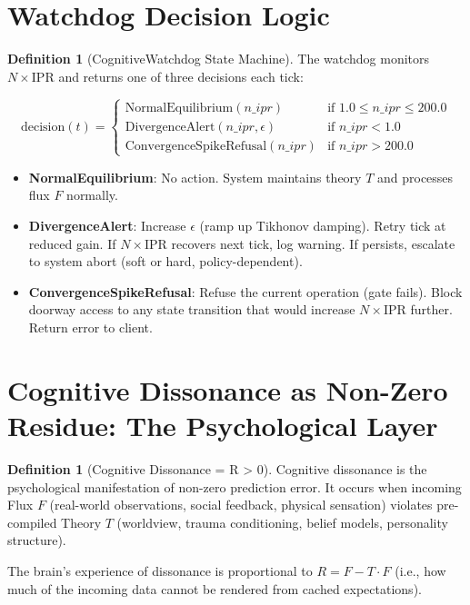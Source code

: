 \documentclass[11pt,oneside]{article}
\theoremstyle{definition}
\newtheorem{definition}[theorem]{Definition}
\begin{document}
\section{Watchdog Decision Logic}

\begin{definition}[CognitiveWatchdog State Machine]
The watchdog monitors $N \times \text{IPR}$ and returns one of three decisions each tick:

\[
\text{decision}(t) = \begin{cases}
\text{NormalEquilibrium}(n\_ipr) & \text{if } 1.0 \le n\_ipr \le 200.0 \\
\text{DivergenceAlert}(n\_ipr, \epsilon) & \text{if } n\_ipr < 1.0 \\
\text{ConvergenceSpikeRefusal}(n\_ipr) & \text{if } n\_ipr > 200.0
\end{cases}
\]

\begin{itemize}
  \item \textbf{NormalEquilibrium}: No action. System maintains theory $T$ and processes flux $F$ normally.
  \item \textbf{DivergenceAlert}: Increase $\epsilon$ (ramp up Tikhonov damping). Retry tick at reduced gain. If $N \times \text{IPR}$ recovers next tick, log warning. If persists, escalate to system abort (soft or hard, policy-dependent).
  \item \textbf{ConvergenceSpikeRefusal}: Refuse the current operation (gate fails). Block doorway access to any state transition that would increase $N \times \text{IPR}$ further. Return error to client.
\end{itemize}
\end{definition}

\section{Cognitive Dissonance as Non-Zero Residue: The Psychological Layer}

\begin{definition}[Cognitive Dissonance = R > 0]
Cognitive dissonance is the psychological manifestation of non-zero prediction error. It occurs when incoming Flux $F$ (real-world observations, social feedback, physical sensation) violates pre-compiled Theory $T$ (worldview, trauma conditioning, belief models, personality structure).

The brain's experience of dissonance is proportional to $R = F - T \cdot F$ (i.e., how much of the incoming data cannot be rendered from cached expectations).
\end{definition}
\end{document}
